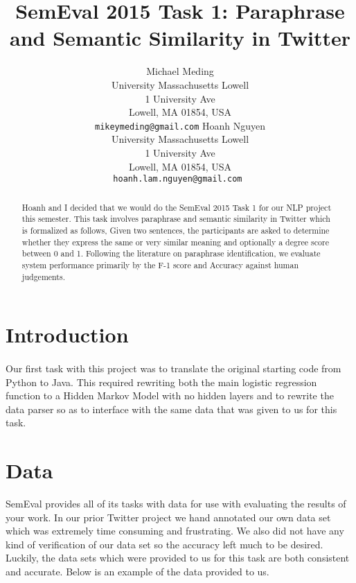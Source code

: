 \documentclass[11pt,letterpaper]{article}
\title{SemEval 2015 Task 1: Paraphrase and Semantic Similarity in Twitter}
\author{
	Michael Meding\\
  	University Massachusetts Lowell\\
	1 University Ave\\
	Lowell, MA 01854, USA\\
   {\tt mikeymeding@gmail.com}
	\And  
   Hoanh Nguyen\\
	University Massachusetts Lowell\\
	1 University Ave\\
	Lowell, MA 01854, USA\\
	{\tt hoanh.lam.nguyen@gmail.com }
}
\date{}
\begin{document}
\maketitle
\begin{abstract}
Hoanh and I decided that we would do the SemEval 2015 Task 1 for our NLP project this semester. This task involves paraphrase and semantic similarity in Twitter which is formalized as follows, Given two sentences, the participants are asked to determine whether they express the same or very similar meaning and optionally a degree score between 0 and 1. Following the literature on paraphrase identification, we evaluate system performance primarily by the F-1 score and Accuracy against human judgements. 
\end{abstract}

\section{Introduction}
\paragraph{} 
Our first task with this project was to translate the original starting code from Python to Java. This required rewriting both the main logistic regression function to a Hidden Markov Model with no hidden layers and to rewrite the data parser so as to interface with the same data that was given to us for this task.


\section{Data}
SemEval provides all of its tasks with data for use with evaluating the results of your work. In our prior Twitter project we hand annotated our own data set which was 
extremely time consuming and frustrating. We also did not have any kind of verification of our data set so the accuracy left much to be desired. Luckily, the data sets which were provided to us for this task are both consistent and accurate. Below is an example of the data provided to us.


  
\end{document}
